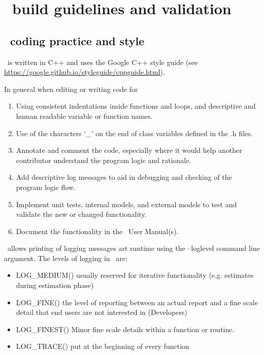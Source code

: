 \section{\CNAME\ build guidelines and validation\label{sec:buildrules}}

\subsection{\CNAME\ coding practice and style}\label{subsec:codepractice}

\CNAME\ is written in C++ and uses the Google C++ style guide (see \url{https://google.github.io/styleguide/cppguide.html}). 

In general when editing or writing code for \CNAME\:

\begin{enumerate}
  \item Using consistent indentations inside functions and loops, and descriptive and human readable variable or function names.
  \item Use of the characters `\_' on the end of class variables defined in the .h files. 
  \item Annotate and comment the code, especially where it would help another contributor understand the program logic and rationale.
  \item Add descriptive log messages to aid in debugging and checking of the program logic flow.
  \item Implement unit tests, internal models, and external models to test and validate the new or changed functionality.
  \item Document the functionality in the \CNAME\ User Manual(s).
\end{enumerate}

\CNAME\ allows printing of logging messages art runtime using the --loglevel command line argument. The levels of logging in \CNAME\ are:

\begin{itemize}
	\item LOG\_MEDIUM()  usually reserved for iterative functionality (e.g. estimates during estimation phase)
	\item LOG\_FINE() the level of reporting between an actual report and a fine scale detail that end users are not interested in (Developers)
	\item LOG\_FINEST() Minor fine scale details within a function or routine.
	\item LOG\_TRACE() put at the beginning of every function
\end{itemize}

